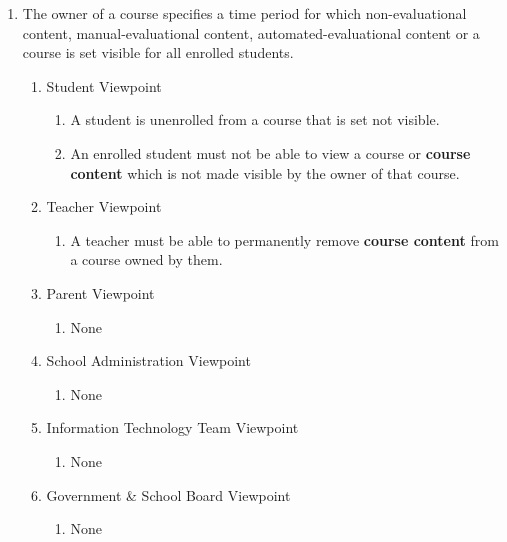 \documentclass[]{article}
\begin{document}
\begin{enumerate}[{BE}1.]
	\item The owner of a course specifies a time period for which non-evaluational
content, manual-evaluational content, automated-evaluational content or a course
is set visible for all enrolled students.
	\begin{enumerate}[{VP2}.1]
		\item Student Viewpoint
			\begin{enumerate}
				\item A student is unenrolled from a course that is set not visible.
				\item An enrolled student must not be able to view a course or
\textbf{course content} which is not made visible by the owner of that course.
			\end{enumerate}
		\item Teacher Viewpoint
			\begin{enumerate}
				\item A teacher must be able to permanently remove \textbf{course content}
from a course owned by them.
			\end{enumerate}
		\item Parent Viewpoint
			\begin{enumerate}
				\item None
			\end{enumerate}
		\item School Administration Viewpoint
			\begin{enumerate}
				\item None
			\end{enumerate}
		\item Information Technology Team Viewpoint
			\begin{enumerate}
				\item None
			\end{enumerate}
		\item Government \& School Board Viewpoint
			\begin{enumerate}
				\item None
			\end{enumerate}
	\end{enumerate}



\end{enumerate}
\end{document}
